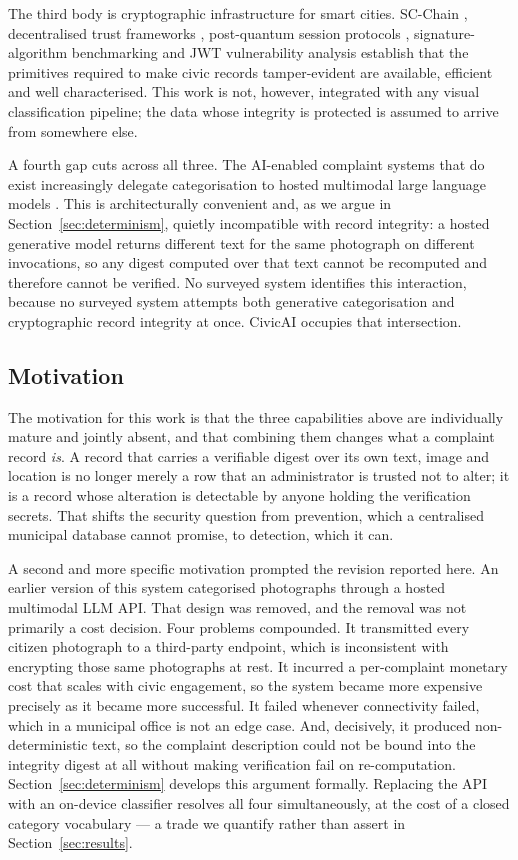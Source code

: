 \documentclass[conference]{IEEEtran}
\begin{document}
The third body is cryptographic infrastructure for smart cities. SC-Chain \cite{l16scchain}, decentralised trust frameworks \cite{l17decentralizedtrust}, post-quantum session protocols \cite{l18pqcsession}, signature-algorithm benchmarking \cite{l19ecdsabenchmark} and JWT vulnerability analysis \cite{l20jwteemo} establish that the primitives required to make civic records tamper-evident are available, efficient and well characterised. This work is not, however, integrated with any visual classification pipeline; the data whose integrity is protected is assumed to arrive from somewhere else.

A fourth gap cuts across all three. The AI-enabled complaint systems that do exist increasingly delegate categorisation to hosted multimodal large language models \cite{l9mllmaudit, l10quantizedvlm, l12urbanllava, touvron2023llama}. This is architecturally convenient and, as we argue in Section~\ref{sec:determinism}, quietly incompatible with record integrity: a hosted generative model returns different text for the same photograph on different invocations, so any digest computed over that text cannot be recomputed and therefore cannot be verified. No surveyed system identifies this interaction, because no surveyed system attempts both generative categorisation and cryptographic record integrity at once. CivicAI occupies that intersection.

\subsection{Motivation}
The motivation for this work is that the three capabilities above are individually mature and jointly absent, and that combining them changes what a complaint record \emph{is}. A record that carries a verifiable digest over its own text, image and location is no longer merely a row that an administrator is trusted not to alter; it is a record whose alteration is detectable by anyone holding the verification secrets. That shifts the security question from prevention, which a centralised municipal database cannot promise, to detection, which it can.

A second and more specific motivation prompted the revision reported here. An earlier version of this system categorised photographs through a hosted multimodal LLM API. That design was removed, and the removal was not primarily a cost decision. Four problems compounded. It transmitted every citizen photograph to a third-party endpoint, which is inconsistent with encrypting those same photographs at rest. It incurred a per-complaint monetary cost that scales with civic engagement, so the system became more expensive precisely as it became more successful. It failed whenever connectivity failed, which in a municipal office is not an edge case. And, decisively, it produced non-deterministic text, so the complaint description could not be bound into the integrity digest at all without making verification fail on re-computation. Section~\ref{sec:determinism} develops this argument formally. Replacing the API with an on-device classifier resolves all four simultaneously, at the cost of a closed category vocabulary --- a trade we quantify rather than assert in Section~\ref{sec:results}.
\end{document}
